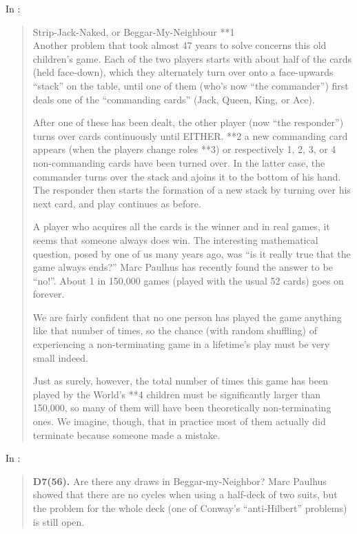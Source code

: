 \documentclass[a4paper,12pt]{article}
\begin{document}
In \cite[p.892]{winning_ways_2004}:
\begin{quotation}
Strip-Jack-Naked, or Beggar-My-Neighbour **1\\

Another problem that took almost 47 years to solve concerns this old children’s game. Each of
the two players starts with about half of the cards (held face-down), which they alternately turn
over onto a face-upwards “stack” on the table, until one of them (who's now “the commander”)
first deals one of the “commanding cards” (Jack, Queen, King, or Ace).

After one of these has been dealt, the other player (now “the responder”) turns over cards
continuously until EITHER. **2 a new commanding card appears (when the players change
roles **3) or respectively 1, 2, 3, or 4 non-commanding cards have been turned over. In the
latter case, the commander turns over the stack and ajoins it to the bottom of his hand. The
responder then starts the formation of a new stack by turning over his next card, and play
continues as before.

A player who acquires all the cards is the winner and in real games, it seems that someone
always does win. The interesting mathematical question, posed by one of us many years ago,
was “is it really true that the game always ends?” Marc Paulhus has recently found the answer
to be “no!”. About 1 in 150,000 games (played with the usual 52 cards) goes on forever.

We are fairly confident that no one person has played the game anything like that number
of times, so the chance (with random shuffling) of experiencing a non-terminating game in a
lifetime’s play must be very small indeed.

Just as surely, however, the total number of times this game has been played by the
World’s **4 children must be significantly larger than 150,000, so many of them will have
been theoretically non-terminating ones. We imagine, though, that in practice most of them
actually did terminate because someone made a mistake.
\end{quotation}

In \cite[p.483]{albert2009games}:%
\begin{quotation}
\textbf{D7(56).} Are there any draws in Beggar-my-Neighbor? Marc Paulhus
showed that there are no cycles when using a half-deck of two suits, but the problem for the whole deck (one of Conway’s “anti-Hilbert” problems) is still open.
\end{quotation}
\end{document}
